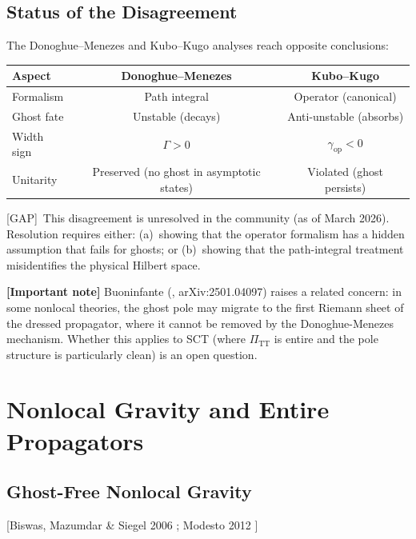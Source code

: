 \documentclass[11pt,a4paper]{article}
\theoremstyle{plain}
\theoremstyle{definition}
\theoremstyle{remark}
\newcommand{\PiTT}{\Pi_{\mathrm{TT}}}
\newcommand{\fromlit}[1]{\textcolor{blue!70!black}{\textsf{[#1]}}}
\newcommand{\gap}{\textcolor{red!80!black}{\textsf{[GAP]}}}
\newcommand{\signcorrection}[1]{%
  \par\smallskip\noindent
  \colorbox{red!10}{\parbox{\dimexpr\linewidth-2\fboxsep}{%
    \textcolor{red!60!black}{\textbf{[Important note]}} #1}}%
  \par\smallskip}
\begin{document}
\subsection{Status of the Disagreement}

The Donoghue--Menezes and Kubo--Kugo analyses reach opposite
conclusions:
\begin{center}
\begin{tabular}{lcc}
\toprule
Aspect & Donoghue--Menezes & Kubo--Kugo \\
\midrule
Formalism & Path integral & Operator (canonical) \\
Ghost fate & Unstable (decays) & Anti-unstable (absorbs) \\
Width sign & $\Gamma > 0$ & $\gamma_{\mathrm{op}} < 0$ \\
Unitarity & Preserved (no ghost in asymptotic states) &
  Violated (ghost persists) \\
\bottomrule
\end{tabular}
\end{center}

\gap\ This disagreement is unresolved in the community (as of March 2026).
Resolution requires either:
(a)~showing that the operator formalism has a hidden assumption that
  fails for ghosts; or
(b)~showing that the path-integral treatment misidentifies the physical
  Hilbert space.

\signcorrection{Buoninfante (\cite{Buoninfante2025}, arXiv:2501.04097)
raises a related concern: in some nonlocal theories, the ghost pole may
migrate to the first Riemann sheet of the dressed propagator, where it
cannot be removed by the Donoghue-Menezes mechanism.  Whether this
applies to SCT (where $\PiTT$ is entire and the pole structure is
particularly clean) is an open question.}


\section{Nonlocal Gravity and Entire Propagators}
\label{sec:nonlocal}

\subsection{Ghost-Free Nonlocal Gravity}

\fromlit{Biswas, Mazumdar \& Siegel 2006 \cite{BMS2006};
Modesto 2012 \cite{Modesto2012}}
\end{document}
